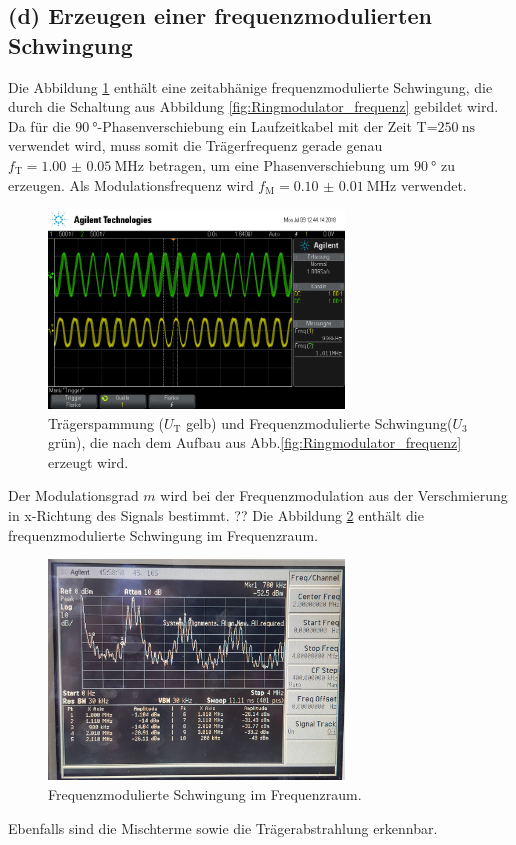 \FloatBarrier
\subsection{(d) Erzeugen einer frequenzmodulierten Schwingung}
\label{subsec:auswertung_d}
Die Abbildung \ref{fig:freq_zeit} enthält eine zeitabhänige frequenzmodulierte
Schwingung, die durch die Schaltung aus Abbildung \ref{fig:Ringmodulator_frequenz}
gebildet wird.
Da für die  $\SI{90}{\degree}$-Phasenverschiebung ein Laufzeitkabel mit der
Zeit T=$\SI{250}{\nano\second}$ verwendet wird, muss somit die
Trägerfrequenz gerade genau $f_{\text{T}} = \SI{1.00(5)}{\mega\hertz}$
betragen, um eine Phasenverschiebung um $\SI{90}{\degree}$
zu erzeugen. Als Modulationsfrequenz wird
$f_{\text{M}}=\SI{0.10(1)}{\mega\hertz}$ verwendet.

\begin{figure}
  \centering
  \includegraphics[width=0.7\textwidth]{osci/freq_mod.png}
  \caption{Trägerspammung ($U_{\text{T}}$ gelb) und Frequenzmodulierte
  Schwingung($U_3$ grün), die nach dem Aufbau aus Abb.\ref{fig:Ringmodulator_frequenz} erzeugt wird.}
  \label{fig:freq_zeit}
\end{figure}
Der Modulationsgrad $m$ wird bei der Frequenzmodulation
aus der Verschmierung in x-Richtung des Signals bestimmt.
??
Die Abbildung \ref{fig:frequenz_freq} enthält die frequenzmodulierte Schwingung
im Frequenzraum.
\begin{figure}
  \centering
  \includegraphics[width=0.7\textwidth]{spec/frequenzmodulation_bereich_fresh_cool.jpg}
  \caption{Frequenzmodulierte
Schwingung im Frequenzraum.}
\label{fig:frequenz_freq}
\end{figure}
Ebenfalls sind die Mischterme sowie die Trägerabstrahlung erkennbar.


